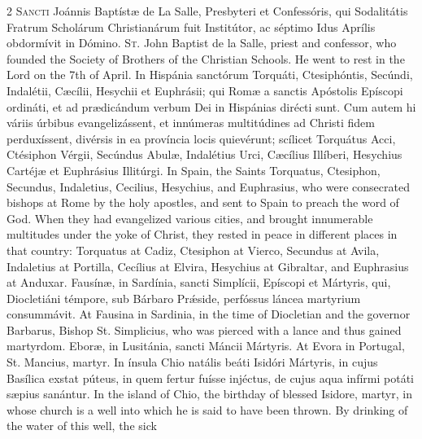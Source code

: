 \begin{paracol}{2}
\lettrine[lines=2]{S}{ancti} Joánnis 
 Baptístæ de La Salle, Presbyteri et Confessóris, qui Sodalitátis Fratrum 
 Scholárum Christianárum fuit Institútor, ac séptimo Idus Aprílis obdormívit 
 in Dómino.
\switchcolumn
{}
\lettrine[lines=2]{S}{t.} John Baptist de la Salle, 
 priest and confessor, who founded the Society of Brothers of the Christian 
 Schools. He went to rest in the Lord on the 7th of April.
\switchcolumn*
{}
In Hispánia sanctórum 
 Torquáti, Ctesiphóntis, Secúndi, Indalétii, Cæcílii, Hesychii et Euphrásii; 
 qui Romæ a sanctis Apóstolis Epíscopi ordináti, et ad prædicándum verbum Dei 
 in Hispánias dirécti sunt. Cum autem hi váriis úrbibus evangelizássent, 
 et innúmeras multitúdines ad Christi fidem perduxíssent, divérsis in ea 
 província locis quievérunt; scílicet Torquátus Acci, Ctésiphon Vérgii, 
 Secúndus Abulæ, Indalétius Urci, Cæcílius Illíberi, Hesychius Cartéjæ et 
 Euphrásius Illitúrgi.
\switchcolumn
{}
In Spain, the Saints Torquatus, 
 Ctesiphon, Secundus, Indaletius, Cecilius, Hesychius, and Euphrasius, who 
 were consecrated bishops at Rome by the holy apostles, and sent to Spain to 
 preach the word of God. When they had evangelized various cities, and 
 brought innumerable multitudes under the yoke of Christ, they rested in 
 peace in different places in that country: Torquatus at Cadiz, Ctesiphon at 
 Vierco, Secundus at Avila, Indaletius at Portilla, Cecílius at Elvira, 
 Hesychius at Gibraltar, and Euphrasius at Anduxar.
\switchcolumn*
{}
Fausínæ, in Sardínia, sancti Simplícii, Epíscopi et Mártyris, qui, Diocletiáni témpore, sub 
 Bárbaro Prǽside, perfóssus láncea martyrium consummávit.
\switchcolumn
{}
At Fausina in Sardinia, in the time 
 of Diocletian and the governor Barbarus, Bishop St. Simplicius, who was 
 pierced with a lance and thus gained martyrdom.
\switchcolumn*
{}
Eboræ, in Lusitánia, 
 sancti Máncii Mártyris.
\switchcolumn
{}
At Evora in Portugal, St. Mancius, 
 martyr.
\switchcolumn*
{}
In ínsula Chio natális 
 beáti Isidóri Mártyris, in cujus Basílica exstat púteus, in quem fertur 
 fuísse injéctus, de cujus aqua infírmi potáti sæpius sanántur.
\switchcolumn
{}
In the island of Chio, the birthday 
 of blessed Isidore, martyr, in whose church is a well into which he is said 
 to have been thrown. By drinking of the water of this well, the sick 

\end{paracol}
